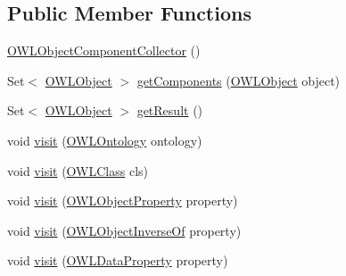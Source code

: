 \subsection*{Public Member Functions}
\begin{DoxyCompactItemize}
\item 
\hyperlink{classorg_1_1semanticweb_1_1owlapi_1_1util_1_1_o_w_l_object_component_collector_a7d75b2451aa043cfafe797ff685bc6fd}{O\-W\-L\-Object\-Component\-Collector} ()
\item 
Set$<$ \hyperlink{interfaceorg_1_1semanticweb_1_1owlapi_1_1model_1_1_o_w_l_object}{O\-W\-L\-Object} $>$ \hyperlink{classorg_1_1semanticweb_1_1owlapi_1_1util_1_1_o_w_l_object_component_collector_a6e8a115f628ae127326deff5837a5526}{get\-Components} (\hyperlink{interfaceorg_1_1semanticweb_1_1owlapi_1_1model_1_1_o_w_l_object}{O\-W\-L\-Object} object)
\item 
Set$<$ \hyperlink{interfaceorg_1_1semanticweb_1_1owlapi_1_1model_1_1_o_w_l_object}{O\-W\-L\-Object} $>$ \hyperlink{classorg_1_1semanticweb_1_1owlapi_1_1util_1_1_o_w_l_object_component_collector_a16f636f4e7f4bd1c814f27f1df8a90bb}{get\-Result} ()
\item 
void \hyperlink{classorg_1_1semanticweb_1_1owlapi_1_1util_1_1_o_w_l_object_component_collector_a0db3a250f8dda2421f1bf4793f541238}{visit} (\hyperlink{interfaceorg_1_1semanticweb_1_1owlapi_1_1model_1_1_o_w_l_ontology}{O\-W\-L\-Ontology} ontology)
\item 
void \hyperlink{classorg_1_1semanticweb_1_1owlapi_1_1util_1_1_o_w_l_object_component_collector_a8b815b21192ec58a4168e0f3df695590}{visit} (\hyperlink{interfaceorg_1_1semanticweb_1_1owlapi_1_1model_1_1_o_w_l_class}{O\-W\-L\-Class} cls)
\item 
void \hyperlink{classorg_1_1semanticweb_1_1owlapi_1_1util_1_1_o_w_l_object_component_collector_a96e328a9ba26d1e4594a4ab4b3791c81}{visit} (\hyperlink{interfaceorg_1_1semanticweb_1_1owlapi_1_1model_1_1_o_w_l_object_property}{O\-W\-L\-Object\-Property} property)
\item 
void \hyperlink{classorg_1_1semanticweb_1_1owlapi_1_1util_1_1_o_w_l_object_component_collector_a239e8ca4ab927d1c1bbf6e911dbd94a2}{visit} (\hyperlink{interfaceorg_1_1semanticweb_1_1owlapi_1_1model_1_1_o_w_l_object_inverse_of}{O\-W\-L\-Object\-Inverse\-Of} property)
\item 
void \hyperlink{classorg_1_1semanticweb_1_1owlapi_1_1util_1_1_o_w_l_object_component_collector_a374ddb30ca0685a7d47eed50b7950e8b}{visit} (\hyperlink{interfaceorg_1_1semanticweb_1_1owlapi_1_1model_1_1_o_w_l_data_property}{O\-W\-L\-Data\-Property} property)

\end{DoxyCompactItemize}
